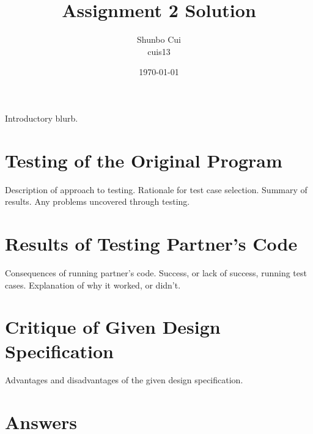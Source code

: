 \documentclass[12pt]{article}
\title{Assignment 2 Solution}
\author{Shunbo Cui\\cuis13}
\date{\today}
\begin{document}
\maketitle

Introductory blurb.

\section{Testing of the Original Program}

Description of approach to testing.  Rationale for test case selection.  Summary
of results.  Any problems uncovered through testing.

\section{Results of Testing Partner's Code}

Consequences of running partner's code.  Success, or lack of success, running
test cases.  Explanation of why it worked, or didn't.

\section{Critique of Given Design Specification}

Advantages and disadvantages of the given design specification.

\section{Answers}
\end{document}
